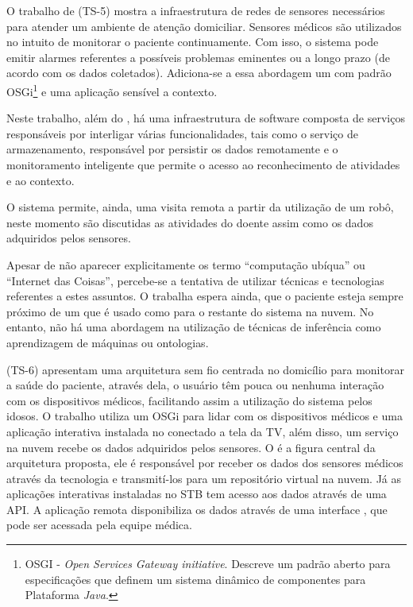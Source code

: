 O trabalho de  (TS-5) mostra a infraestrutura de redes
de sensores necessários para atender um ambiente de atenção domiciliar.
Sensores médicos são utilizados no intuito de monitorar o paciente
continuamente. Com isso, o sistema pode emitir alarmes referentes a possíveis
problemas eminentes ou a longo prazo (de acordo com os dados coletados).
Adiciona-se a essa abordagem um \middleware[] com padrão OSGi\footnote{OSGI -
\textit{Open Services Gateway initiative}. Descreve um padrão aberto para
especificações que definem um sistema dinâmico de componentes para Plataforma
\textit{Java}.} e uma aplicação sensível a contexto.

Neste trabalho, além do \middleware, há uma infraestrutura de software composta
de serviços responsáveis por interligar várias funcionalidades, tais como o
serviço de armazenamento, responsável por persistir os dados remotamente e o
monitoramento inteligente que permite o acesso ao reconhecimento de atividades
e ao contexto.  

O sistema permite, ainda, uma visita remota a partir da utilização de um robô,
neste momento são discutidas as atividades do doente assim como os dados
adquiridos pelos sensores.

Apesar de não aparecer explicitamente os termo ``computação ubíqua'' ou ``Internet
das Coisas'', percebe-se a tentativa de utilizar técnicas e tecnologias referentes a
estes assuntos. O trabalha espera ainda, que o paciente esteja sempre próximo
de um \smartphone[] que é usado como \gateway[] para o restante do sistema na nuvem.
No entanto, não há uma abordagem na utilização de técnicas de inferência como
aprendizagem de máquinas ou ontologias.

 (TS-6) apresentam uma arquitetura sem fio centrada no
domicílio para monitorar a saúde do paciente, através dela, o usuário têm pouca
ou nenhuma interação com os dispositivos médicos, facilitando assim a
utilização do sistema pelos idosos. O trabalho utiliza um \framework[] OSGi para
lidar com os dispositivos médicos e uma aplicação interativa instalada no
\stb[] conectado a tela da TV, além disso, um serviço na nuvem recebe os
dados adquiridos pelos sensores. O \gateway[] é a figura central da arquitetura
proposta, ele é responsável por receber os dados dos sensores médicos através
da tecnologia \bluetooth[] e transmití-los para um repositório virtual na nuvem.
Já as aplicações interativas instaladas no STB tem acesso aos dados através de
uma API. A aplicação remota disponibiliza os dados através de uma interface
\web, que pode ser acessada pela equipe médica.

